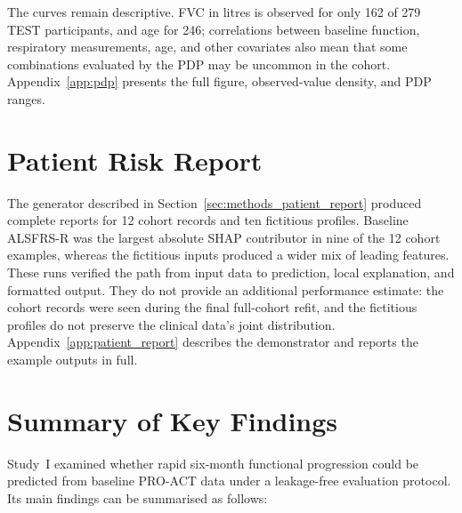 The curves remain descriptive. FVC in litres is observed for only 162 of 279 \gls{TEST} participants, and age for 246; correlations between baseline function, respiratory measurements, age, and other covariates also mean that some combinations evaluated by the PDP may be uncommon in the cohort. Appendix~\ref{app:pdp} presents the full figure, observed-value density, and PDP ranges.

\section{Patient Risk Report}
\label{sec:results_patient_report}

The generator described in Section~\ref{sec:methods_patient_report} produced complete reports for 12 cohort records and ten fictitious profiles. Baseline \gls{ALSFRS-R} was the largest absolute \gls{SHAP} contributor in nine of the 12 cohort examples, whereas the fictitious inputs produced a wider mix of leading features. These runs verified the path from input data to prediction, local explanation, and formatted output. They do not provide an additional performance estimate: the cohort records were seen during the final full-cohort refit, and the fictitious profiles do not preserve the clinical data's joint distribution. Appendix~\ref{app:patient_report} describes the demonstrator and reports the example outputs in full.

\section{Summary of Key Findings}
\label{sec:results_summary}

Study~I examined whether rapid six-month functional progression could be predicted from baseline \gls{PRO-ACT} data under a leakage-free evaluation protocol.
Its main findings can be summarised as follows:

